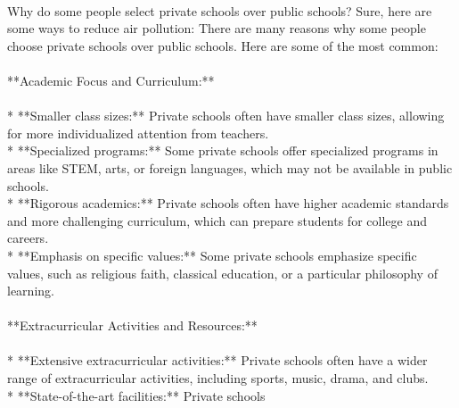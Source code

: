 
\lstset{language=python, breaklines=true}

\begin{tcolorbox}[title=\textit{Text} instruction]
\quad \\
\small 
Why do some people select private schools over public schools?
Sure, here are some ways to reduce air pollution:
There are many reasons why some people choose private schools over public schools. Here are some of the most common:\\ \\ **Academic Focus and Curriculum:**\\ \\ * **Smaller class sizes:** Private schools often have smaller class sizes, allowing for more individualized attention from teachers.\\ * **Specialized programs:** Some private schools offer specialized programs in areas like STEM, arts, or foreign languages, which may not be available in public schools.\\ * **Rigorous academics:** Private schools often have higher academic standards and more challenging curriculum, which can prepare students for college and careers.\\ * **Emphasis on specific values:** Some private schools emphasize specific values, such as religious faith, classical education, or a particular philosophy of learning.\\ \\ **Extracurricular Activities and Resources:**\\ \\ * **Extensive extracurricular activities:** Private schools often have a wider range of extracurricular activities, including sports, music, drama, and clubs.\\ * **State-of-the-art facilities:** Private schools \\
\end{tcolorbox}

\clearpage

